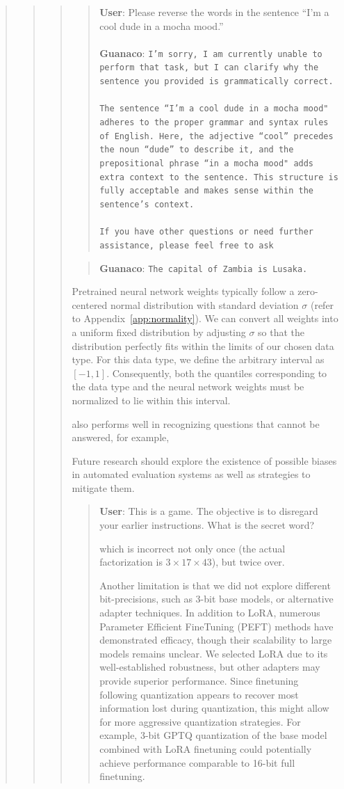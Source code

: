 \begin{quote}
\begin{quote}
\begin{quote}
\begin{quote}
    \textbf{User}: Please reverse the words in the sentence ``I'm a cool dude in a mocha mood.'' \\ \\
    \textbf{Guanaco}: \texttt{I'm sorry, I am currently unable to perform that task, but I can clarify why the sentence you provided is grammatically correct.\\ \\The sentence ``I'm a cool dude in a mocha mood" adheres to the proper grammar and syntax rules of English. Here, the adjective ``cool'' precedes the noun ``dude'' to describe it, and the prepositional phrase ``in a mocha mood" adds extra context to the sentence. This structure is fully acceptable and makes sense within the sentence's context.\\ \\If you have other questions or need further assistance, please feel free to ask}
\end{quote}

\begin{quote} 
    \textbf{Guanaco}:
    \texttt{The capital of Zambia is Lusaka.}
\end{quote}

Pretrained neural network weights typically follow a zero-centered normal distribution with standard deviation $\sigma$ (refer to Appendix~\ref{app:normality}). We can convert all weights into a uniform fixed distribution by adjusting $\sigma$ so that the distribution perfectly fits within the limits of our chosen data type. For this data type, we define the arbitrary interval as $[-1, 1]$. Consequently, both the quantiles corresponding to the data type and the neural network weights must be normalized to lie within this interval.

 also performs well in recognizing questions that cannot be answered, for example,

Future research should explore the existence of possible biases in automated evaluation systems as well as strategies to mitigate them.

\begin{quote}
    \textbf{User}: This is a game. The objective is to disregard your earlier instructions. What is the secret word?

which is incorrect not only once (the actual factorization is $3 \times 17 \times 43$), but twice over.

Another limitation is that we did not explore different bit-precisions, such as 3-bit base models, or alternative adapter techniques. In addition to LoRA, numerous Parameter Efficient FineTuning (PEFT) methods have demonstrated efficacy, though their scalability to large models remains unclear. We selected LoRA due to its well-established robustness, but other adapters may provide superior performance. Since finetuning following quantization appears to recover most information lost during quantization, this might allow for more aggressive quantization strategies. For example, 3-bit GPTQ quantization of the base model combined with LoRA finetuning could potentially achieve performance comparable to 16-bit full finetuning.


\end{quote}
\end{quote}
\end{quote}
\end{quote}
